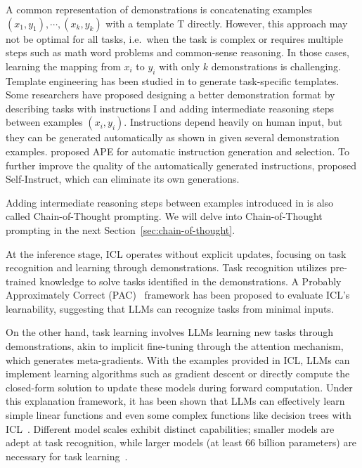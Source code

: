 A common representation of demonstrations is concatenating examples $(x_1, y_1), \cdots, (x_k, y_k)$ with a template T directly.
However, this approach may not be optimal for all tasks, i.e.\ when the task is complex or requires multiple steps such as math word problems and common-sense reasoning.
In those cases, learning the mapping from $x_i$ to $y_i$ with only $k$ demonstrations is challenging.
Template engineering has been studied in \textcite{liu2021pretrain, liu2022good} to generate task-specific templates.
Some researchers have proposed designing a better demonstration format by describing tasks with instructions I and adding intermediate reasoning steps between examples $(x_i, y_i)$.
Instructions depend heavily on human input, but they can be generated automatically as shown in \textcite{honovich2022instruction} given several demonstration examples.
\textcite{zhou2023large} proposed APE for automatic instruction generation and selection.
To further improve the quality of the automatically generated instructions, \textcite{wang2022selfinstruct} proposed Self-Instruct, which can eliminate its own generations.

Adding intermediate reasoning steps between examples introduced in \textcite{wang2023large} is also called Chain-of-Thought prompting.
We will delve into Chain-of-Thought prompting in the next Section~\ref{sec:chain-of-thought}.

At the inference stage, ICL operates without explicit updates, focusing on task recognition and learning through demonstrations.
Task recognition utilizes pre-trained knowledge to solve tasks identified in the demonstrations.
A Probably Approximately Correct (PAC)~\cite{wies2023learnability} framework has been proposed to evaluate ICL’s learnability, suggesting that LLMs can recognize tasks from minimal inputs.

On the other hand, task learning involves LLMs learning new tasks through demonstrations, akin to implicit fine-tuning through the attention mechanism, which generates meta-gradients.
With the examples provided in ICL, LLMs can implement learning algorithms such as gradient descent or directly compute the closed-form solution to update these models during forward computation.
Under this explanation framework, it has been shown that LLMs can effectively learn simple linear functions and even some complex functions like decision trees with ICL~\cite{akyurek2022what}.
Different model scales exhibit distinct capabilities; smaller models are adept at task recognition, while larger models (at least 66 billion parameters) are necessary for task learning~\cite{pan2023what}.

